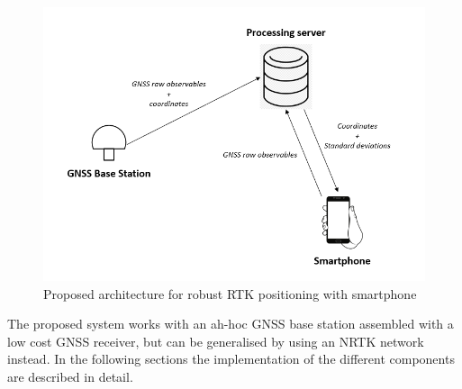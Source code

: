 \begin{figure}[H] 
	\centering
	\includegraphics[scale=0.80]{fig/dev_rtk_arch.PNG} 
	\caption{Proposed architecture for robust RTK positioning with smartphone}
	\label{FIG:dev_rtk_arch} 
\end{figure}
The proposed system works with an ah-hoc GNSS base station assembled with a low cost GNSS receiver, but can be generalised by using an NRTK network instead. In the following sections the implementation of the different components are described in detail.
